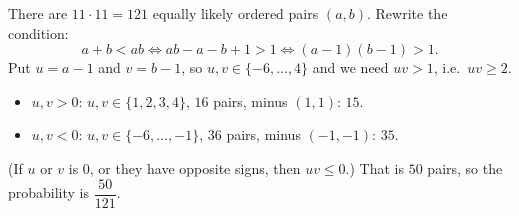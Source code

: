 There are $11\cdot11=121$ equally likely ordered pairs $(a,b)$. Rewrite the condition:
\[a+b<ab\iff ab-a-b+1>1\iff (a-1)(b-1)>1 .\]
Put $u=a-1$ and $v=b-1$, so $u,v\in\{-6,\ldots,4\}$ and we need $uv>1$, i.e.\ $uv\ge2$.
\begin{itemize}
\item $u,v>0$: $u,v\in\{1,2,3,4\}$, $16$ pairs, minus $(1,1)$: $15$.
\item $u,v<0$: $u,v\in\{-6,\ldots,-1\}$, $36$ pairs, minus $(-1,-1)$: $35$.
\end{itemize}
(If $u$ or $v$ is $0$, or they have opposite signs, then $uv\le0$.) That is $50$ pairs, so the probability is $\boxed{\dfrac{50}{121}}$.
